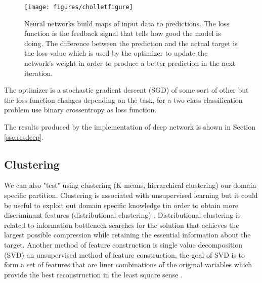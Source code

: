 \documentclass[11pt]{article}
\begin{document}
\begin{figure}[H]
        \centering
        \texttt{[image: figures/cholletfigure]}
        \caption{Neural networks build maps of input data to predictions. The loss function is the feedback signal that tells how good the model is doing. The difference between the prediction and the actual target is the loss value which is used by the optimizer to update the network's weight in order to produce a better prediction in the next iteration.
        }
\label{fig:cholletfig}
\end{figure}

The optimizer is a stochastic gradient descent (SGD) of some sort of other but the loss function changes depending on the task, for a two-class classification problem use binary crossentropy as loss function. 

The results produced by the implementation of deep network is shown in Section \ref{sse:resdeep}.


\subsection{Clustering}

We can also "test" using clustering (K-means, hierarchical clustering) our domain specific partition. Clustering is associated with unsupervised learning but it could be useful to exploit out domain specific knowledge tin order to obtain more discriminant features (distributional clustering) \cite{guyon2003introduction}. Distributional clustering is related to information bottleneck \cite{tishby2015deep} searches for the solution that achieves the largest possible compression while retaining the essential information about the target.
Another method of feature construction is single value decomposition (SVD) an unsupervised method of feature construction, the goal of SVD is to form a set of features that are liner combinations of the original variables which provide the best reconstruction in the least square sense \cite{duda2012pattern}.  
\end{document}
